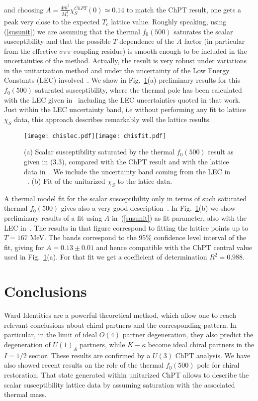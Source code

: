 \documentclass{PoS}
\begin{document}
and choosing $A=\frac{4\hat m^2}{M_\pi^4}\chi^{ChPT}_S (0)\simeq 0.14$ to match the ChPT result, one gets a peak very close to the expected $T_c$ lattice value. Roughly speaking, using (\ref{susunit}) we are assuming that the thermal $f_0(500)$ saturates the scalar susceptibility and that the possible $T$ dependence of the  $A$ factor (in particular from the effective $\sigma\pi\pi$ coupling residue) is smooth enough to be included in the uncertainties of the method.  Actually, the result is  very robust under variations in the unitarization method and under the uncertainty of the Low Energy Constants (LEC) involved~\cite{AGNFSVRnext}. We show in Fig.~\ref{fig:suscep}(a) preliminary results for this $f_0(500)$  saturated susceptibility, where the thermal pole has been calculated with the LEC given in~\cite{Hanhart:2008mx} including the LEC uncertainties quoted in that work. Just within the LEC uncertainty band, i.e without performing any fit to lattice $\chi_S$ data, this approach describes remarkably well the lattice results. 
\begin{figure}
\centerline{\texttt{[image: chislec.pdf]}\texttt{[image: chisfit.pdf]}}
\caption{(a) Scalar susceptibility saturated by the  thermal $f_0(500)$ result as given in (3.3), compared with the ChPT result and with the lattice data in~\cite{Aoki:2009sc}. We include the uncertainty band coming from the LEC in ~\cite{Hanhart:2008mx}. (b) Fit of the unitarized $\chi_S$ to the latice data.}
\label{fig:suscep}
\end{figure}
A thermal model fit for the scalar susceptibility only in terms of such saturated thermal $f_0(500)$ gives also a very good description~\cite{AGNFSVRnext}. In Fig.~\ref{fig:suscep}(b) we show preliminary results of a fit using $A$ in~(\ref{susunit}) as fit parameter, also with the LEC in~\cite{Hanhart:2008mx}. The results in that figure correspond to fitting the lattice points up to $T=167$ MeV. The bands correspond to the 95\% confidence level interval of the fit, giving for $A=0.13\pm 0.01$ and hence compatible with the ChPT central value used in Fig.~\ref{fig:suscep}(a). For that fit we get  a coefficient of determination $R^2=0.988$. 
\section{Conclusions} 
Ward Identities are a powerful theoretical method, which allow one to reach relevant conclusions about chiral partners and the corresponding pattern. 
In particular, in the limit of ideal $O(4)$ partner degeneration, they also predict the degeneration of $U(1)_A$ partners, while $K-\kappa$ become ideal chiral partners in the $I=1/2$ sector. These results are confirmed by a $U(3)$ ChPT analysis. We have also showed recent results on the role of the thermal $f_0(500)$ pole for chiral restoration. That state generated within unitarized ChPT allows to describe the scalar susceptibility lattice data by assuming saturation with the associated thermal mass. 
\end{document}
